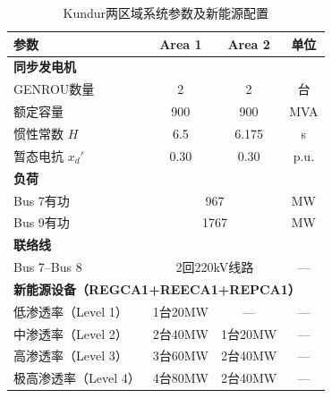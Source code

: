 \begin{table}[htbp]
\centering
\caption{Kundur两区域系统参数及新能源配置}
\label{tab:system_params}
\begin{threeparttable}
\begin{tabular}{lccc}
\toprule
参数 & Area 1 & Area 2 & 单位 \\
\midrule
\multicolumn{4}{l}{\textbf{同步发电机}} \\
GENROU数量 & 2 & 2 & 台 \\
额定容量 & 900 & 900 & MVA \\
惯性常数 $H$ & 6.5 & 6.175 & s \\
暂态电抗 $x_d'$ & 0.30 & 0.30 & p.u. \\
\midrule
\multicolumn{4}{l}{\textbf{负荷}} \\
Bus 7有功 & \multicolumn{2}{c}{967} & MW \\
Bus 9有功 & \multicolumn{2}{c}{1767} & MW \\
\midrule
\multicolumn{4}{l}{\textbf{联络线}} \\
Bus 7--Bus 8 & \multicolumn{2}{c}{2回220kV线路} & --- \\
\midrule
\multicolumn{4}{l}{\textbf{新能源设备（REGCA1+REECA1+REPCA1）}} \\
低渗透率（Level 1） & 1台20MW & --- & --- \\
中渗透率（Level 2） & 2台40MW & 1台20MW & --- \\
高渗透率（Level 3） & 3台60MW & 2台40MW & --- \\
极高渗透率（Level 4） & 4台80MW & 2台40MW & --- \\
\bottomrule
\end{tabular}
\end{threeparttable}
\end{table}
